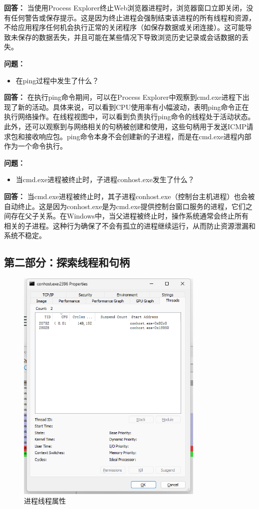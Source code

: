 \documentclass[12pt,a4paper]{article}
\begin{document}
\textbf{回答：}
当使用Process Explorer终止Web浏览器进程时，浏览器窗口立即关闭，没有任何警告或保存提示。这是因为终止进程会强制结束该进程的所有线程和资源，不给应用程序任何机会执行正常的关闭程序（如保存数据或关闭连接）。这可能导致未保存的数据丢失，并且可能在某些情况下导致浏览历史记录或会话数据的丢失。

\textbf{问题：}
\begin{itemize}
    \item 在ping过程中发生了什么？
\end{itemize}

\textbf{回答：}
在执行ping命令期间，可以在Process Explorer中观察到cmd.exe进程下出现了新的活动。具体来说，可以看到CPU使用率有小幅波动，表明ping命令正在执行网络操作。在线程视图中，可以看到负责执行ping命令的线程处于活动状态。此外，还可以观察到与网络相关的句柄被创建和使用，这些句柄用于发送ICMP请求包和接收响应包。ping命令本身不会创建新的子进程，而是在cmd.exe进程内部作为一个命令执行。

\textbf{问题：}
\begin{itemize}
    \item 当cmd.exe进程被终止时，子进程conhost.exe发生了什么？
\end{itemize}

\textbf{回答：}
当cmd.exe进程被终止时，其子进程conhost.exe（控制台主机进程）也会被自动终止。这是因为conhost.exe是为cmd.exe提供控制台窗口服务的进程，它们之间存在父子关系。在Windows中，当父进程被终止时，操作系统通常会终止所有相关的子进程。这种行为确保了不会有孤立的进程继续运行，从而防止资源泄漏和系统不稳定。

\subsection{第二部分：探索线程和句柄}

\begin{figure}[H]
    \centering
    \includegraphics[width=0.8\textwidth]{Thread.png}
    \caption{进程线程属性}
    \label{fig:thread}
\end{figure}
\end{document}
